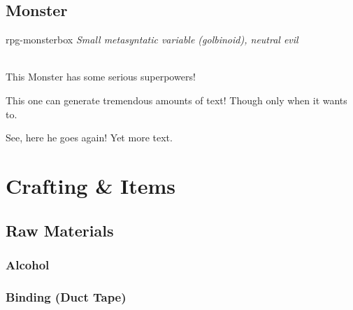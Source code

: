 \documentclass[10pt,twoside,twocolumn]{book}
\begin{document}
\section{Monster}
\begin{rpg-monsterbox}{rpg-monsterbox}
	\textit{Small metasyntatic variable (golbinoid), neutral evil}\\
	\rpghline
	\basics[%
	armorclass = 12,
	hitpoints  = 16 (3d8 + 3),
	speed      = 50 t
	]
	\rpghline
	\stats[ %
    STR = 12, 
    DEX = 7
	]
	\rpghline
	\details[%
	languages = {Common Lisp, Erlang},
	]
	\rpghline \\[1mm]
	\begin{rpg-monsteraction}
		This Monster has some serious superpowers!
	\end{rpg-monsteraction}

	\begin{rpg-monsteraction}
		This one can generate tremendous amounts of text! Though only when it wants to.
	\end{rpg-monsteraction}

	\begin{rpg-monsteraction}
    See, here he goes again! Yet more text.
	\end{rpg-monsteraction}
\end{rpg-monsterbox}

%
%
\mainmatter
\chapter{Crafting \& Items}

\section{Raw Materials}

\subsection{Alcohol}

\subsection{Binding (Duct Tape)}
\end{document}
